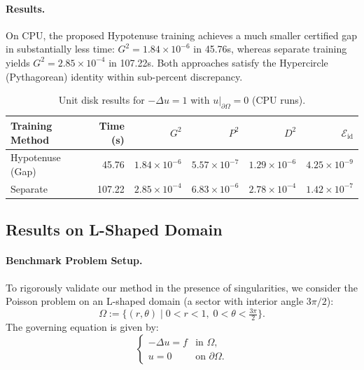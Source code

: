 \documentclass[12pt, a4paper]{article}
\begin{document}
\paragraph{Results.}
On CPU, the proposed Hypotenuse training achieves a much smaller certified gap in substantially less time: $G^2 = 1.84 \times 10^{-6}$ in 45.76s, whereas separate training yields $G^2 = 2.85 \times 10^{-4}$ in 107.22s. Both approaches satisfy the Hypercircle (Pythagorean) identity within sub-percent discrepancy.

\begin{table}[H]
    \centering
    \caption{Unit disk results for $-\Delta u=1$ with $u|_{\partial\Omega}=0$ (CPU runs).}
    \label{tab:disk_results}
    \begin{tabular}{lrrrrr}
        \toprule
        Training Method & Time (s) & $G^2$ & $P^2$ & $D^2$ & $\mathcal{E}_{\text{id}}$ \\
        \midrule
        Hypotenuse (Gap)  & 45.76  & $1.84\times 10^{-6}$ & $5.57\times 10^{-7}$ & $1.29\times 10^{-6}$ &  $4.25\times 10^{-9}$\\
        Separate          & 107.22 & $2.85\times 10^{-4}$ & $6.83\times 10^{-6}$ & $2.78\times 10^{-4}$ & $1.42\times 10^{-7}$ \\
        \bottomrule
    \end{tabular}
\end{table}


\subsection{Results on L-Shaped Domain}
\label{subsec:lshape_results}

\paragraph{Benchmark Problem Setup.}
To rigorously validate our method in the presence of singularities, we consider the Poisson problem on an L-shaped domain (a sector with interior angle $3\pi/2$):
\begin{equation}
    \Omega := \{(r,\theta) \mid 0 < r < 1,\; 0 < \theta < \tfrac{3\pi}{2}\}.
\end{equation}
The governing equation is given by:
\begin{equation}
\label{eq:lshape_strong}
    \begin{cases}
    -\Delta u = f & \text{in } \Omega, \\
    u = 0 & \text{on } \partial\Omega.
    \end{cases}
\end{equation}
\end{document}

